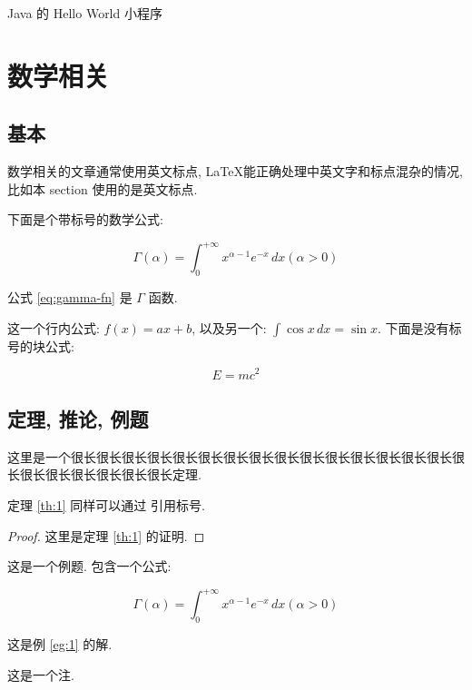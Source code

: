 \documentclass[a4paper, 11pt]{ctexart}
\begin{document}
\begin{listing}[htp]
    \inputminted{cpp}{snippets/Hello.java}
    \caption{Java 的 Hello World 小程序}
    \label{snippet:java-hello}
\end{listing}

\clearpage
\section{数学相关}

\subsection{基本}

数学相关的文章通常使用英文标点, \LaTeX 能正确处理中英文字和标点混杂的情况, 比如本 section 使用的是英文标点.

下面是个带标号的数学公式:

\begin{equation}
    \Gamma(\alpha) = \int_{0}^{+\infty} x^{\alpha - 1} e^{-x} \,dx (\alpha > 0)
    \label{eq:gamma-fn}
\end{equation}

公式 \ref{eq:gamma-fn} 是 $\Gamma$ 函数.

这一个行内公式: $f(x) = ax + b$, 以及另一个: $\int \cos x \,dx = \sin x$. 下面是没有标号的块公式:

$$
    E = mc^2
$$

\subsection{定理, 推论, 例题}

\begin{theorem}
    这里是一个很长很长很长很长很长很长很长很长很长很长很长很长很长很长很长很长很长很长很长很长很长很长定理.
    \label{th:1}
\end{theorem}

定理 \ref{th:1} 同样可以通过 \codeinline{\ref} 引用标号.

\begin{proof}
    这里是定理 \ref{th:1} 的证明.
\end{proof}

\begin{example}
    这是一个例题. 包含一个公式:

    \begin{equation}
        \Gamma(\alpha) = \int_{0}^{+\infty} x^{\alpha - 1} e^{-x} \,dx (\alpha > 0)
    \end{equation}

    \label{eg:1}
\end{example}

\begin{solution}
    这是例 \ref{eg:1} 的解.
\end{solution}

\begin{remark}
    这是一个注.
\end{remark}

\clearpage



\end{document}
